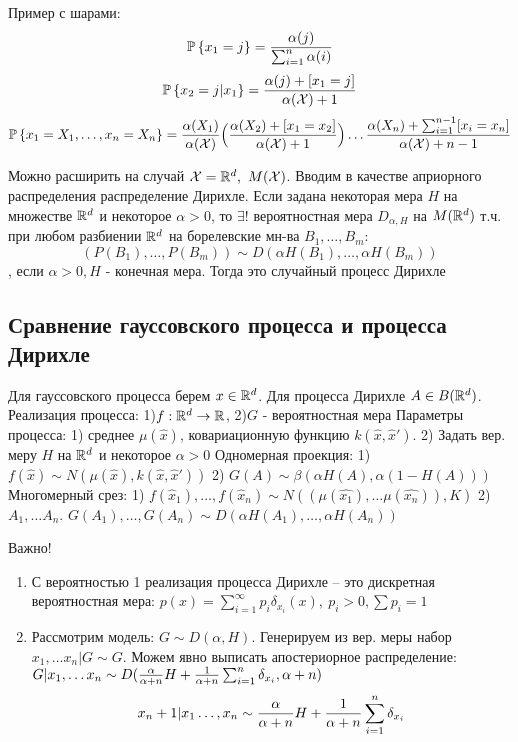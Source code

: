 Пример с шарами: 
$$ \mathbb{P}\left\{ x_1=j \right\} = \frac{\alpha(j)}{\sum_{i=1}^n \alpha(i)} $$
$$ \mathbb{P}\left\{ x_2=j|x_1 \right\} = \frac{\alpha(j) + [x_1=j]}{\alpha(\mathcal{X}) + 1} $$
$$ \mathbb{P}\left\{ x_1=X_1, \ldots, x_n=X_n \right\} = \frac{\alpha(X_1)}{\alpha(\mathcal{X})} \Big( \frac{\alpha(X_2) + [x_1=x_2]}{\alpha(\mathcal{X})+1}\Big) \ldots 
\frac{\alpha(X_n) + \sum_{i=1}^{n-1}[x_i=x_n]}{\alpha(\mathcal{X})+n-1} $$

Можно расширить на случай $\setX=\setR^d, \ M(\setX)$. Вводим в качестве априорного распределения распределение Дирихле. Если задана некоторая мера $H$ на множестве $\mathbb{R}^d$ и некоторое $\alpha>0$, то $\exists !$ вероятностная мера  $D_{\alpha, H}$ на $M(\mathbb{R}^d)$ т.ч. при любом разбиении $\mathbb{R}^d$ на борелевские мн-ва $B_1, \ldots, B_m$:
$$ (P(B_1), \ldots, P(B_m)) \sim D(\alpha H(B_1), \ldots, \alpha H(B_m)) $$, если $\alpha>0, H$ - конечная мера. Тогда это случайный процесс Дирихле

\subsection*{Сравнение гауссовского процесса и процесса Дирихле}
Для гауссовского процесса берем $x \in \mathbb{R}^d$. Для процесса Дирихле $A \in B(\mathbb{R}^d)$.
Реализация процесса:
1)$ f: \mathbb{R}^d \to \mathbb{R} $, 
2)$ G$ - вероятностная мера
Параметры процесса:
1) среднее $\mu(\hat{x})$, ковариационную функцию $k(\hat{x}, \hat{x}')$. 
2) Задать вер. меру $H$ на $\mathbb{R}^d$ и некоторое $\alpha>0$
Одномерная проекция:
1) $f(\hat{x}) \sim N(\mu(\hat{x}), k(\hat{x}, \hat{x}'))$ 
2) $G(A) \sim \beta(\alpha H(A), \alpha (1-H(A)))$
Многомерный срез:
1) $f(\hat{x}_1), \ldots, f(\hat{x}_n) \sim N((\mu(\hat{x_1}), \ldots \mu(\hat{x_n})), K)$ 
2)$A_1, \ldots A_n$. $G(A_1) ,\ldots, G(A_n) \sim D(\alpha H(A_1), \ldots, \alpha H(A_n))$


Важно!
\begin{enumerate}
	\item С вероятностью 1 реализация процесса Дирихле – это дискретная вероятностная мера: $p(x) = \sum_{i=1}^\infty p_i \delta_{x_i}(x), \ p_i >0, \sum p_i=1$
	\item Рассмотрим модель: $G \sim D(\alpha, H)$. Генерируем из вер. меры набор $x_1, \ldots x_n | G \sim G$. Можем явно выписать апостериорное распределение: $G | x_1, \ldots x_n \sim D(\frac{\alpha}{\alpha+n}H + \frac{1}{\alpha+n}\sum_{\substack{i=1}}^n \delta_{x_i}, \alpha+n)$
	$$ x_n+1 | x_1 \ldots, x_n \sim \frac{\alpha}{\alpha+n}H + \frac{1}{\alpha+n}\sum_{\substack{i=1}}^n \delta_{x_i}$$
\end{enumerate}


